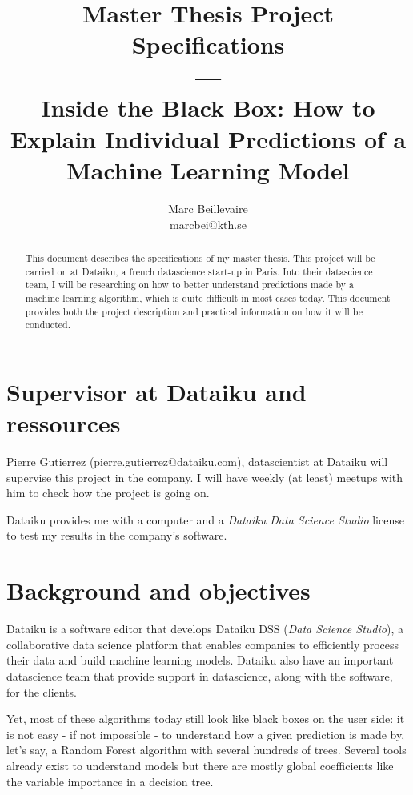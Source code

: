\documentclass[a4paper]{article}
\title{Master Thesis Project Specifications \\ — \\ Inside the Black Box: How to Explain Individual Predictions of a Machine Learning Model}
\author{Marc Beillevaire \\ marcbei@kth.se}
\begin{document}
\maketitle

\begin{abstract}
This document describes the specifications of my master thesis. This project will be carried on at Dataiku, a french datascience start-up in Paris. Into their datascience team, I will be researching on how to better understand predictions made by a machine learning algorithm, which is quite difficult in most cases today. This document provides both the project description and practical information on how it will be conducted.
\end{abstract}


\section{Supervisor at Dataiku and ressources}

Pierre Gutierrez (pierre.gutierrez@dataiku.com), datascientist at Dataiku will supervise this project in the company. I will have weekly (at least) meetups with him to check how the project is going on.

Dataiku provides me with a computer and a \textit{Dataiku Data Science Studio} license to test my results in the company's software.

\section{Background and objectives}

Dataiku is a software editor that develops Dataiku DSS (\textit{Data Science Studio}), a collaborative data science platform that enables companies to efficiently process their data and build machine learning models. Dataiku also have an important datascience team that provide support in datascience, along with the software, for the clients.

Yet, most of these algorithms today still look like black boxes on the user side: it is not easy - if not impossible - to understand how a given prediction is made by, let's say, a Random Forest algorithm with several hundreds of trees. Several tools already exist to understand models but there are mostly global coefficients like the variable importance in a decision tree.
\end{document}

